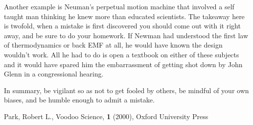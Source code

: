 \documentclass{article}
\begin{document}
Another example is Neuman's perpetual motion machine that involved a self taught man thinking he knew more than educated scientists. The takeaway here is twofold, when a mistake is first discovered you should come out with it right away, and be sure to do your homework. If Newman had understood the first law of thermodynamics or back EMF at all, he would have known the design wouldn't work. All he had to do is open a textbook on either of these subjects and it would have spared him the embarrassment of getting shot down by John Glenn in a congressional hearing. 

In summary, be vigilant so as not to get fooled by others, be mindful of your own biases, and be humble enough to admit a mistake. 










\begin{thebibliography}{9}
 Park, Robert L., Voodoo Science, \textbf{1} (2000), Oxford University Press
\end{thebibliography}
\end{document}

